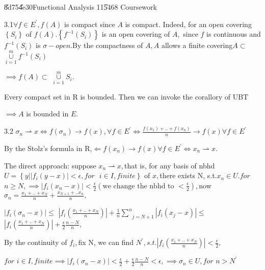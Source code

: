 \documentclass{article}
\begin{document}
\bigskip \bigskip \U{8d75}\U{4e30}\qquad \qquad Functional
Analysis 11\U{5468} Coursework

3.1$\forall f\in E^{\prime },f\left( A\right) $ is compact since $A$ is
compact. Indeed, for an open covering $\left\{ S_{i}\right\} $ of $f\left(
A\right) .\left\{ f^{-1}\left( S_{i}\right) \right\} $ is an open covering
of $A,$ since $f$ is continuous and $f^{-1}\left( S_{i}\right) $ is $\sigma
-open.$By the compactness of $A,A$ allows a finite covering$A\subset $ $%
\underset{i=1}{\overset{m}{\cup }}f^{-1}\left( S_{i}\right) $

$\implies f\left( A\right) \subset $ $\underset{i=1}{\overset{m}{\cup }}%
S_{i}.$

Every compact set in R is bounded. Then we can invoke the corallory of UBT

$\implies A$ is bounded in $E.$

3.2 $\sigma _{n}\rightharpoonup x\iff f\left( \sigma _{n}\right) \rightarrow
f\left( x\right) ,\forall f\in E^{\prime }\iff \frac{f\left( x_{1}\right)
+..+f\left( x_{n}\right) }{n}\rightarrow f\left( x\right) \forall f\in
E^{\prime }$

By the Stolz's formula in R,$\Longleftarrow f\left( x_{n}\right) \rightarrow
f\left( x\right) \forall f\in E^{\prime }\iff x_{n}\rightharpoonup x.$

The direct approach: suppose $x_{n}\rightharpoonup x,$that is, for any basis
of nbhd $U=\left\{ y|\left\vert f_{i}\left( y-x\right) \right\vert <\epsilon
,for\text{ }i\in I,finite\right\} $ of $x,$there exists N, s.t.$x_{n}\in
U.for$ $n\geq N,\implies \left\vert f_{i}\left( x_{n}-x\right) \right\vert <%
\frac{\epsilon }{2}\left( \text{we change the nbhd to }<\frac{\epsilon }{2}%
\right) ,$now $\sigma _{n}=\frac{x_{1}+..+x_{N}}{n}+\frac{x_{N+1}+..x_{n}}{n}%
,$

$\left\vert f_{i}\left( \sigma _{n}-x\right) \right\vert \leq $ $\left\vert
f_{i}\left( \frac{x_{1}+..+x_{N}}{n}\right) \right\vert +\frac{1}{n}\underset%
{j=N+1}{\overset{n}{\sum }}\left\vert f_{i}\left( x_{j}-x\right) \right\vert
\leq $ $\left\vert f_{i}\left( \frac{x_{1}+..+x_{N}}{n}\right) \right\vert +%
\frac{\epsilon }{2}\frac{n-N}{n},$

By the continuity of $f_{i},$fix N, we can find $N^{\prime },s.t.\left\vert
f_{i}\left( \frac{x_{1}+..+x_{N}}{n}\right) \right\vert <\frac{\epsilon }{2}%
, $

$for$ $i\in I,finite\implies \left\vert f_{i}\left( \sigma _{n}-x\right)
\right\vert <\frac{\epsilon }{2}+\frac{\epsilon }{2}\frac{n-N}{n}<\epsilon
,\implies \sigma _{n}\in U,for$ $n>N^{\prime }$
\end{document}
